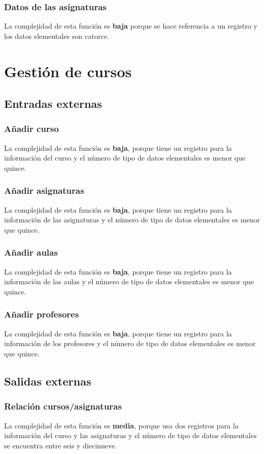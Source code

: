 \documentclass[11pt,a4paper,spanish,twoside]{book}
\begin{document}
\subsubsection{Datos de las asignaturas}
La complejidad de esta función es \textbf{baja} porque se hace referencia a
un registro y los datos elementales son catorce.

\section{Gestión de cursos}
\subsection{Entradas externas}
\subsubsection{Añadir curso}
La complejidad de esta función es \textbf{baja}, porque tiene un
registro para la información del curso y el número de tipo de datos
elementales es menor que quince.

\subsubsection{Añadir asignaturas}
La complejidad de esta función es \textbf{baja}, porque tiene un
registro para la información de las asignaturas y el número de tipo de datos
elementales es menor que quince.

\subsubsection{Añadir aulas}
La complejidad de esta función es \textbf{baja}, porque tiene un
registro para la información de las aulas y el número de tipo de datos
elementales es menor que quince.

\subsubsection{Añadir profesores}
La complejidad de esta función es \textbf{baja}, porque tiene un
registro para la información de los profesores y el número de tipo de datos
elementales es menor que quince.

\subsection{Salidas externas}
\subsubsection{Relación cursos/asignaturas}
La complejidad de esta función es \textbf{media}, porque usa dos
registros para la información del curso y las asignaturas y el número de tipo
de datos elementales se encuentra entre seis y diecinueve.
\end{document}
